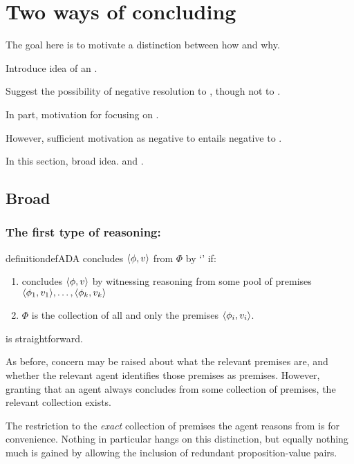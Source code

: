 \chapter{Two ways of concluding}
\label{chap:twoc}

\begin{note}[Goal]
  The goal here is to motivate a distinction between how and why.

  Introduce idea of an \itp{}.

  Suggest the possibility of negative resolution to \issueInclusion{}, though not to \issueConstraint{}.

  In part, motivation for focusing on \issueConstraint{}.

  However, sufficient motivation as negative to \issueConstraint{} entails negative to \issueInclusion{}.
\end{note}

\begin{note}
  In this section, broad idea.
  \adA{} and \adB{}.
\end{note}

\section{Broad}
\label{chap:twoc:broad}

\subsection{The first type of reasoning: \adA{}}

\begin{note}
  \begin{restatable}[\adA{}]{definition}{defADA}
    \label{AR:adA}
    \label{def:adA}
    \vAgent{} concludes \(\langle \phi, v \rangle\) from \(\Phi\) by `\adA{}' if:
    \begin{enumerate}[label=\textsf{S:\arabic*}., ref=(\textsf{S}:\arabic*)]
    \item
      \label{def:adA:psi}
      \vAgent{} concludes \(\langle \phi, v \rangle\) by witnessing reasoning from some pool of premises \(\langle \phi_{1}, v_{1} \rangle,\dots,\langle \phi_{k}, v_{k} \rangle\)
    \item
      \(\Phi\) is the collection of all and only the premises \(\langle \phi_{i}, v_{i} \rangle\).
    \end{enumerate}
    \vspace{-\baselineskip}
  \end{restatable}

  \adA{} is straightforward.

  As before, concern may be raised about what the relevant premises are, and whether the relevant agent identifies those premises as premises.
  However, granting that an agent always concludes from some collection of premises, the relevant collection exists.

  The restriction to the \emph{exact} collection of premises the agent reasons from is for convenience.
  Nothing in particular hangs on this distinction, but equally nothing much is gained by allowing the inclusion of redundant proposition-value pairs.
\end{note}

